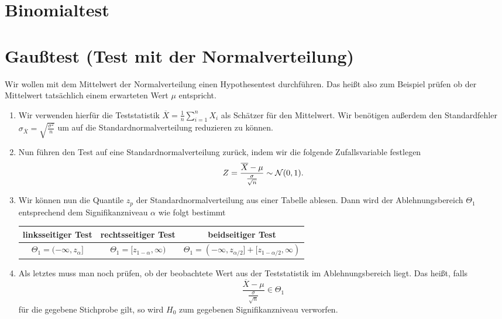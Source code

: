 \section{Binomialtest}

\section{Gaußtest (Test mit der Normalverteilung)}
Wir wollen mit dem Mittelwert der Normalverteilung einen Hypothesentest durchführen. Das heißt also zum Beispiel prüfen ob der Mittelwert tatsächlich einem erwarteten Wert $\mu$ entspricht.
\begin{enumerate}
	\item Wir verwenden hierfür die Teststatistik $\overline X=\frac1n\sum_{i=1}^n X_i$ als Schätzer für den Mittelwert. Wir benötigen außerdem den Standardfehler $\sigma_{\overline X}=\sqrt{\frac{\sigma^2}{n}}$ um auf die Standardnormalverteilung reduzieren zu können.
	\item Nun führen den Test auf eine Standardnormalverteilung zurück, indem wir die folgende Zufallsvariable festlegen
	\begin{equation*}
		Z=\frac{\overline X-\mu}{\frac{\sigma}{\sqrt n}}\sim\mathcal{N}(0,1).
	\end{equation*}
	\item Wir können nun die Quantile $z_p$ der Standardnormalverteilung aus einer Tabelle ablesen.
	Dann wird der Ablehnungsbereich $\Theta_1$ entsprechend dem Signifikanzniveau $\alpha$ wie folgt bestimmt
	\begin{center}
		\begin{tabular}{c|c|c}
			linksseitiger Test&rechtsseitiger Test&beidseitiger Test\\\hline
			$\Theta_1=(-\infty, z_{\alpha}]$&$\Theta_1=[z_{1-\alpha},\infty)$&$\Theta_1=(-\infty, z_{\alpha/2}]+[z_{1-\alpha/2},\infty)$
		\end{tabular}
	\end{center}
	\item Als letztes muss man noch prüfen, ob der beobachtete Wert aus der Teststatistik im Ablehnungsbereich liegt. Das heißt, falls
	\begin{equation*}
	 	\frac{\overline X-\mu}{\frac{\sigma}{\sqrt n}}\in \Theta_1
	\end{equation*}
	für die gegebene Stichprobe gilt, so wird $H_0$ zum gegebenen Signifikanzniveau verworfen.
\end{enumerate}
